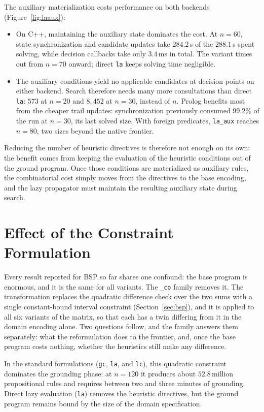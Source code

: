 The auxiliary materialization costs performance on both backends (Figure~\ref{fig:laaux}):
\begin{itemize}
    \item On C++, maintaining the auxiliary state dominates the cost. At $n=60$, state synchronization and candidate updates take $284.2$\,s of the $288.1$\,s spent solving, while decision callbacks take only $3.4$\,ms in total. The variant times out from $n=70$ onward; direct \texttt{la} keeps solving time negligible.
    \item The auxiliary conditions yield no applicable candidates at decision points on either backend. Search therefore needs many more consultations than direct \texttt{la}: $573$ at $n=20$ and $8{,}452$ at $n=30$, instead of $n$. Prolog benefits most from the cheaper trail updates: synchronization previously consumed $99.2\%$ of the run at $n=30$, its last solved size. With foreign predicates, \texttt{la\_aux} reaches $n=80$, two sizes beyond the native frontier.
\end{itemize}

Reducing the number of heuristic directives is therefore not enough on its own: the benefit comes from keeping the evaluation of the heuristic conditions out of the ground program. Once those conditions are materialized as auxiliary rules, the combinatorial cost simply moves from the directives to the base encoding, and the lazy propagator must maintain the resulting auxiliary state during search.

\section{Effect of the Constraint Formulation}
\label{sec:constr-form}

Every result reported for BSP so far shares one confound: the base program is enormous, and it is the same for all variants. The \texttt{\_co} family removes it. The transformation replaces the quadratic difference check over the two sums with a single constant-bound interval constraint (Section~\ref{sec:bsp}), and it is applied to all six variants of the matrix, so that each has a twin differing from it in the domain encoding alone. Two questions follow, and the family answers them separately: what the reformulation does to the frontier, and, once the base program costs nothing, whether the heuristics still make any difference.

In the standard formulations (\texttt{gc}, \texttt{la}, and \texttt{lc}), this quadratic constraint dominates the grounding phase: at $n=120$ it produces about $52.8$\,million propositional rules and requires between two and three minutes of grounding. Direct lazy evaluation (\texttt{la}) removes the heuristic directives, but the ground program remains bound by the size of the domain specification.

